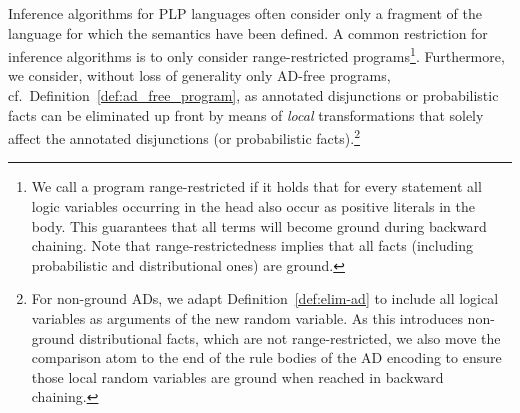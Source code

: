 Inference algorithms for PLP languages often consider only a fragment of the language for which the semantics have been defined. A common restriction for inference algorithms is to only consider range-restricted programs\footnote{We call a \dcproblogsty program range-restricted if it holds that for every statement all logic variables occurring in the head also occur as positive literals in the body. This guarantees that all terms will become ground during backward chaining. Note that range-restrictedness implies that all facts (including probabilistic and distributional ones) are ground.}. 
Furthermore, we consider, without loss of generality only AD-free programs, cf.~Definition~\ref{def:ad_free_program}, as annotated disjunctions or probabilistic facts can be eliminated up front by means of {\em local} transformations that  solely affect the annotated disjunctions (or probabilistic facts).\footnote{For non-ground ADs, we adapt Definition~\ref{def:elim-ad} to include all logical variables as arguments of the new random variable. As this introduces non-ground distributional facts, which are not range-restricted, we also move the comparison atom to the end of the rule bodies of the AD encoding to ensure those local random variables are ground when reached in backward chaining.}




